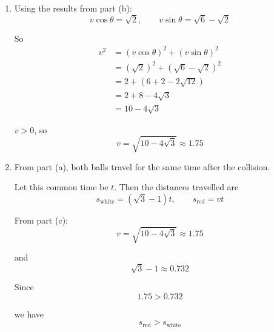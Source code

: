 \documentclass[leqno]{article}
\begin{document}
\begin{enumerate}[
  label=\textbf{\arabic*.},
  leftmargin=*,
  topsep=0pt,
  partopsep=0pt,
  parsep=0pt
]
\begin{djsSolution}
\begin{enumerate}[label=\textbf{(\alph*)}]
  Resolving parallel to $AB$ and using conservation of momentum:
  \[
  2\cos15^\circ = (\sqrt3-1)\cos45^\circ + v\cos\theta
  \]

  Hence
  \begin{align*}
  v\cos\theta
  &= 2\cos15^\circ - (\sqrt3-1)\cos45^\circ \\
  &= 2\times \frac{\sqrt6+\sqrt2}{4} - (\sqrt3-1)\times \frac{\sqrt2}{2} \\
  &= \frac{\sqrt6+\sqrt2}{2} - \frac{\sqrt6-\sqrt2}{2} \\
  &= \sqrt2
  \end{align*}

  From part (a):
  \[
  v\sin\theta = \sqrt6-\sqrt2
  \]

  Therefore
  \begin{align*}
  \tan\theta
  &= \frac{v\sin\theta}{v\cos\theta}
  = \frac{\sqrt6-\sqrt2}{\sqrt2} \\
  &= \sqrt3-1
  \end{align*}

  So
  \[
  \theta=\tan^{-1}(\sqrt3-1)=36.2^\circ\qquad\text{(1 d.p.)}
  \]


  \item Using the results from part (b):
  \[
  v\cos\theta=\sqrt2,
  \qquad
  v\sin\theta=\sqrt6-\sqrt2
  \]

  So
  \begin{align*}
  v^2
  &= (v\cos\theta)^2 + (v\sin\theta)^2 \\
  &= (\sqrt2)^2 + (\sqrt6-\sqrt2)^2 \\
  &= 2 + (6+2-2\sqrt{12}) \\
  &= 2 + 8 - 4\sqrt3 \\
  &= 10-4\sqrt3
  \end{align*}

  \(v>0\), so
  \[
  v=\sqrt{10-4\sqrt3}\approx 1.75
  \]

  \item From part (a), both balls travel for the same time after the collision.

  Let this common time be $t$. Then the distances travelled are
  \[
  s_{\text{white}}=(\sqrt3-1)t,
  \qquad
  s_{\text{red}}=vt
  \]

  From part (c):
  \[
  v=\sqrt{10-4\sqrt3}\approx 1.75
  \]

  and
  \[
  \sqrt3-1\approx 0.732
  \]

  Since
  \[
  1.75 > 0.732
  \]

  we have
  \[
  s_{\text{red}} > s_{\text{white}}
  \]


\end{enumerate}
\end{djsSolution}
\end{enumerate}
\end{document}
